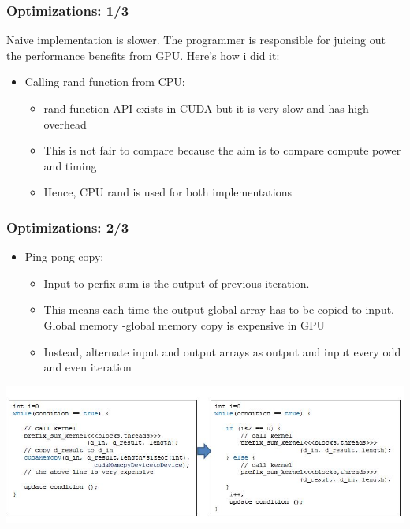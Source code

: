 \documentclass[mathserif]{beamer}
\begin{document}
\begin{frame}                                                                                                                                                                          
\frametitle{Optimizations: 1/3}
Naive implementation is slower. The programmer is responsible for juicing out the performance benefits from GPU. Here's how i did it:
\begin{itemize}
\item Calling rand function from CPU: 
\begin{itemize}
\item rand function API exists in CUDA but it is very slow and has high overhead
\item This is not fair to compare because the aim is to compare compute power and timing
\item Hence, CPU rand is used for both implementations 
\end{itemize}
\end{itemize}
\end{frame}              
\begin{frame}                                                                                                                                                                          
\frametitle{Optimizations: 2/3}
\begin{itemize}
\item Ping pong copy: 
\begin{itemize}
\item Input to perfix sum is the output of previous iteration.  
\item This means each time the output global array has to be copied to input. Global memory -global memory copy is expensive in GPU 
\item Instead, alternate input and output arrays as output and input every odd and even iteration 
\end{itemize}
\end{itemize}
\begin{center}
\includegraphics[scale=0.5]{pingpong.JPG}
\end{center}
\end{frame}              
\end{document}
